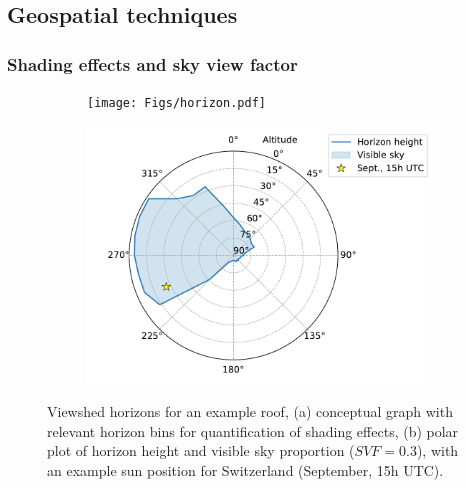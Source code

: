 \subsection{Geospatial techniques}
\label{GIS_methods}

\subsubsection{Shading effects and sky view factor}

\begin{figure}[htb]
	\centering
	\begin{subfigure}[t]{.49\textwidth}
		\centering
		\texttt{[image: Figs/horizon.pdf]}  
		\subcaption{}
	\end{subfigure}
	\begin{subfigure}[t]{.49\textwidth}
		\centering
		\includegraphics[width=\linewidth]{images/Figs/skyview_point_w_star.pdf}  
		\subcaption{}
		\label{figb:horizon_method}
	\end{subfigure}
	\caption{Viewshed horizons for an example roof, (a) conceptual graph with relevant horizon bins for quantification of shading effects, (b) polar plot of horizon height and visible sky proportion ($\mathit{SVF} = 0.3$), with an example sun position for Switzerland (September, 15h UTC).}
	\label{fig:horizon_method}
\end{figure}

